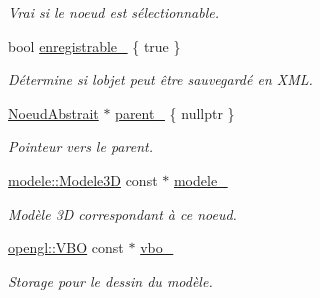\begin{DoxyCompactItemize}
\begin{DoxyCompactList}\small\item\em Vrai si le noeud est sélectionnable. \end{DoxyCompactList}\item 
\hypertarget{class_noeud_abstrait_aa4b43e83161e8650b8810c8e29f0c985}{}bool \hyperlink{class_noeud_abstrait_aa4b43e83161e8650b8810c8e29f0c985}{enregistrable\+\_\+} \{ true \}\label{class_noeud_abstrait_aa4b43e83161e8650b8810c8e29f0c985}

\begin{DoxyCompactList}\small\item\em Détermine si l\textquotesingle{}objet peut être sauvegardé en X\+M\+L. \end{DoxyCompactList}\item 
\hypertarget{class_noeud_abstrait_a002558def0146fea8c413c7928b962a1}{}\hyperlink{class_noeud_abstrait}{Noeud\+Abstrait} $\ast$ \hyperlink{class_noeud_abstrait_a002558def0146fea8c413c7928b962a1}{parent\+\_\+} \{ nullptr \}\label{class_noeud_abstrait_a002558def0146fea8c413c7928b962a1}

\begin{DoxyCompactList}\small\item\em Pointeur vers le parent. \end{DoxyCompactList}\item 
\hypertarget{class_noeud_abstrait_abc3dc8e24578214b7c6081be3246645e}{}\hyperlink{classmodele_1_1_modele3_d}{modele\+::\+Modele3\+D} const $\ast$ \hyperlink{class_noeud_abstrait_abc3dc8e24578214b7c6081be3246645e}{modele\+\_\+}\label{class_noeud_abstrait_abc3dc8e24578214b7c6081be3246645e}

\begin{DoxyCompactList}\small\item\em Modèle 3\+D correspondant à ce noeud. \end{DoxyCompactList}\item 
\hypertarget{class_noeud_abstrait_ae53668f6c4df669a0923a16b3cb84f83}{}\hyperlink{classopengl_1_1_v_b_o}{opengl\+::\+V\+B\+O} const $\ast$ \hyperlink{class_noeud_abstrait_ae53668f6c4df669a0923a16b3cb84f83}{vbo\+\_\+}\label{class_noeud_abstrait_ae53668f6c4df669a0923a16b3cb84f83}

\begin{DoxyCompactList}\small\item\em Storage pour le dessin du modèle. \end{DoxyCompactList}\end{DoxyCompactItemize}


